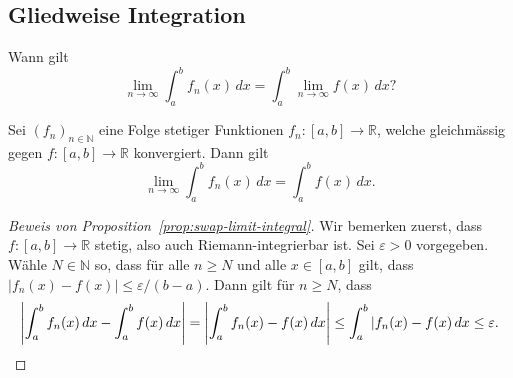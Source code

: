 \documentclass[../main.tex]{subfiles}
\begin{document}




\subsection*{Gliedweise Integration}
\begin{question}
  Wann gilt
  \[
    \lim_{n \to \infty} \int_{a}^{b} f_n(x) \, dx = \int_{a}^{b} \lim_{n \to \infty} f(x)\, dx?
  \]
\end{question}

\begin{proposition}\label{prop:swap-limit-integral}
  Sei ${(f_{n})}_{n \in \mathbb{N}}$ eine Folge stetiger Funktionen
  $f_n \colon [a, b] \to \mathbb{R}$, welche gleichmässig
  gegen $f \colon[a, b] \to \mathbb{R}$ konvergiert. Dann gilt
  \[
    \lim_{n \to \infty} \int_{a}^{b} f_n(x) \, dx = \int_{a}^{b} f(x) \, dx.
  \]
\end{proposition}

\begin{proof}[Beweis von Proposition~\ref{prop:swap-limit-integral}]
  Wir bemerken zuerst, dass $f \colon [a, b] \to \mathbb{R}$ stetig, also auch
  Riemann-integrierbar ist.
  Sei $\varepsilon > 0$ vorgegeben.
  Wähle $N \in \mathbb{N}$ so, dass für alle $n \geq N$ und alle $x \in [a, b]$ gilt,
  dass
  $|f_n(x) - f(x)| \leq \varepsilon/(b-a)$.
  Dann gilt für $n \geq N$, dass
  \[
     \left| \int_{a}^{b} f_n(x) \, dx - \int_{a}^{b} f(x) \, dx\right|  
     = \left| \int_{a}^{b} f_n(x) - f(x) \, dx \right|  
     \leq \int_{a}^{b} |f_n(x) - f(x) \, dx \leq \varepsilon.\qedhere
  \]
\end{proof}
\end{document}
